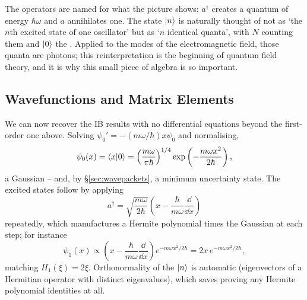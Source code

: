 \documentclass[a4paper]{scrartcl}
\begin{document}
\begin{center}
\end{center}

The operators are named for what the picture shows: $a^\dagger$ creates a quantum of energy $\hbar\omega$ and $a$ annihilates one. The state $\ket{n}$ is naturally thought of not as `the $n$th excited state of one oscillator' but as `$n$ identical quanta', with $N$ counting them and $\ket{0}$ the . Applied to the modes of the electromagnetic field, those quanta are photons; this reinterpretation is the beginning of quantum field theory, and it is why this small piece of algebra is so important.

\subsection{Wavefunctions and Matrix Elements}

We can now recover the IB results with no differential equations beyond the first-order one above. Solving $\psi_0' = -(m\omega/\hbar)x\psi_0$ and normalising,
$$
\psi_0(x) = \braket{x}{0} = \left( \frac{m\omega}{\pi\hbar} \right)^{1/4} \exp\left( -\frac{m\omega x^2}{2\hbar} \right),
$$
a Gaussian -- and, by \S\ref{sec:wavepackets}, a minimum uncertainty state. The excited states follow by applying
$$
a^\dagger = \sqrt{\frac{m\omega}{2\hbar}}\left( x - \frac{\hbar}{m\omega}\frac{\dd}{\dd x} \right)
$$
repeatedly, which manufactures a Hermite polynomial times the Gaussian at each step; for instance
$$
\psi_1(x) \propto \left(x - \frac{\hbar}{m\omega}\frac{\dd}{\dd x}\right) e^{-m\omega x^2/2\hbar} = 2x \, e^{-m\omega x^2/2\hbar},
$$
matching $H_1(\xi) = 2\xi$. Orthonormality of the $\ket{n}$ is automatic (eigenvectors of a Hermitian operator with distinct eigenvalues), which saves proving any Hermite polynomial identities at all.
\end{document}
